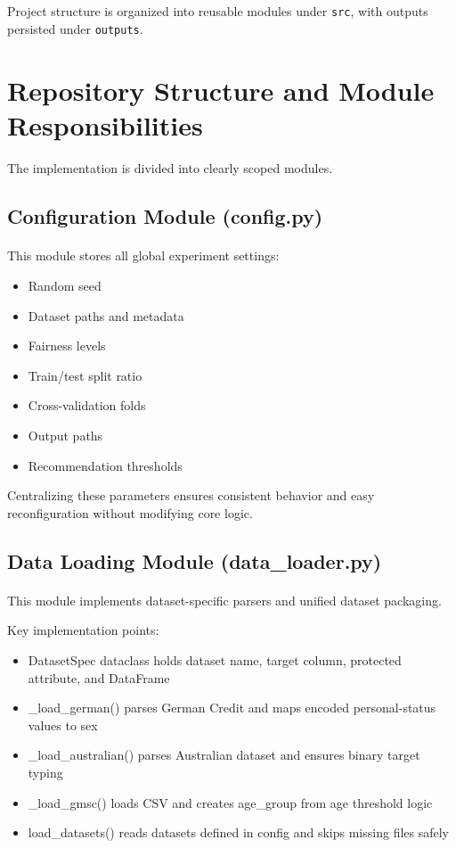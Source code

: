 Project structure is organized into reusable modules under \texttt{src}, with outputs persisted under \texttt{outputs}.

\section{Repository Structure and Module Responsibilities}
\paragraph{}

The implementation is divided into clearly scoped modules.

\subsection{Configuration Module (config.py)}
\paragraph{}

This module stores all global experiment settings:
\begin{itemize}
    \item Random seed
    \item Dataset paths and metadata
    \item Fairness levels
    \item Train/test split ratio
    \item Cross-validation folds
    \item Output paths
    \item Recommendation thresholds
\end{itemize}

Centralizing these parameters ensures consistent behavior and easy reconfiguration without modifying core logic.

\subsection{Data Loading Module (data\_loader.py)}
\paragraph{}

This module implements dataset-specific parsers and unified dataset packaging.

Key implementation points:
\begin{itemize}
    \item DatasetSpec dataclass holds dataset name, target column, protected attribute, and DataFrame
    \item \_load\_german() parses German Credit and maps encoded personal-status values to sex
    \item \_load\_australian() parses Australian dataset and ensures binary target typing
    \item \_load\_gmsc() loads CSV and creates age\_group from age threshold logic
    \item load\_datasets() reads datasets defined in config and skips missing files safely
\end{itemize}


